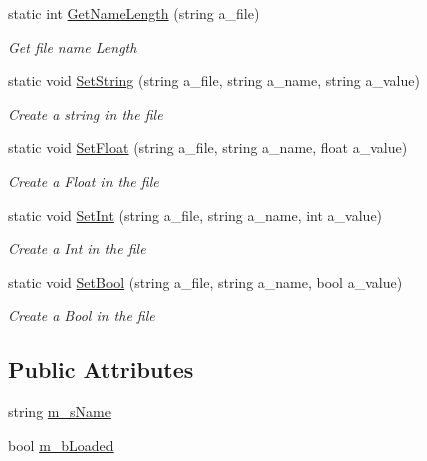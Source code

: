 \begin{DoxyCompactItemize}
static int \mbox{\hyperlink{class_options_file_aa06812a9923c691bcca8af453cfbd295}{Get\+Name\+Length}} (string a\+\_\+file)
\begin{DoxyCompactList}\small\item\em Get file name Length \end{DoxyCompactList}\item 
static void \mbox{\hyperlink{class_options_file_adccaf948e362394757ef2fcde8e229a0}{Set\+String}} (string a\+\_\+file, string a\+\_\+name, string a\+\_\+value)
\begin{DoxyCompactList}\small\item\em Create a string in the file \end{DoxyCompactList}\item 
static void \mbox{\hyperlink{class_options_file_ab075d3f5560f9a8d91c1f3cd1c0592ea}{Set\+Float}} (string a\+\_\+file, string a\+\_\+name, float a\+\_\+value)
\begin{DoxyCompactList}\small\item\em Create a Float in the file \end{DoxyCompactList}\item 
static void \mbox{\hyperlink{class_options_file_a4a6831f269d9d6eeec4e89cd943a8769}{Set\+Int}} (string a\+\_\+file, string a\+\_\+name, int a\+\_\+value)
\begin{DoxyCompactList}\small\item\em Create a Int in the file \end{DoxyCompactList}\item 
static void \mbox{\hyperlink{class_options_file_aff17602090f1d2948aef17426a862356}{Set\+Bool}} (string a\+\_\+file, string a\+\_\+name, bool a\+\_\+value)
\begin{DoxyCompactList}\small\item\em Create a Bool in the file \end{DoxyCompactList}\end{DoxyCompactItemize}
\subsection*{Public Attributes}
\begin{DoxyCompactItemize}
\item 
string \mbox{\hyperlink{class_options_file_af9eef6052dd0b04288f80620f4c761b2}{m\+\_\+s\+Name}}
\item 
bool \mbox{\hyperlink{class_options_file_a3f1c5738c675b2e7bc8589f77a920995}{m\+\_\+b\+Loaded}}
\end{DoxyCompactItemize}


